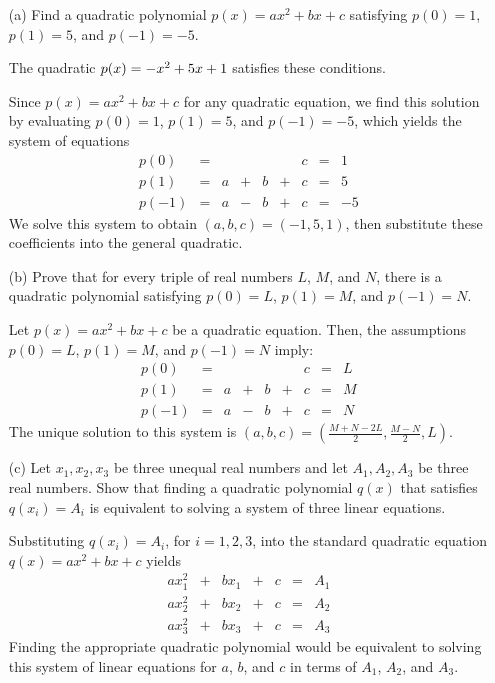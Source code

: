 \documentclass{ximera}
\begin{document}
\begin{exercise} \label{c2.1.11}
\begin{itemize}
\item[(a)] Find a quadratic polynomial $p(x) = ax^2 + bx + c$
  satisfying $p(0) = 1$, $p(1) = 5$, and $p(-1) = -5$.
  \begin{prompt}
    The quadratic $p(x) = {-x^2 + 5x + 1}$ satisfies these conditions.
  \end{prompt}
  \begin{hint}
    Since $p(x) = ax^2 + bx + c$ for any quadratic equation, we find
this solution by evaluating $p(0) = 1$, $p(1) = 5$, and $p(-1) = -5$,
which yields the system of equations
\[
\begin{array}{lrrrrrrrr}
p(0) & = & & & & & c & = & 1 \\
p(1) & = & a & + & b & + & c & = & 5 \\
p(-1) & = & a & - & b & + & c & = & -5\end{array}
\]
We solve this system to obtain $(a,b,c) = (-1,5,1)$, then substitute
these coefficients into the general quadratic.
  \end{hint}
\item[(b)] Prove that for every triple of real numbers $L$, $M$,
and $N$, there is a quadratic polynomial satisfying $p(0) = L$,
$p(1) = M$, and $p(-1) = N$.
\begin{hint}
   Let $p(x) = ax^2 + bx + c$ be a quadratic equation.  Then, the
assumptions $p(0) = L$, $p(1) = M$, and $p(-1) = N$ imply:
\[
\begin{array}{lrrrrrrrr}
p(0) & = & & & & & c & = & L \\
p(1) & = & a & + & b & + & c & = & M \\
p(-1) & = & a & - & b & + & c & = & N\end{array}
\]
The unique solution to this system is $(a,b,c) =
(\frac{M + N - 2L}{2},\frac{M - N}{2},L)$.
\end{hint}
\item[(c)] Let $x_1,x_2,x_3$ be three unequal real
numbers and let $A_1,A_2,A_3$ be three real numbers.  Show
that finding a quadratic polynomial $q(x)$ that satisfies
$q(x_i) = A_i$ is equivalent to solving a system of three
linear equations.
\begin{hint}
   Substituting $q(x_i) = A_i$, for $i = 1,2,3$, into the standard
quadratic equation $q(x) = ax^2 + bx + c$ yields
\[
\begin{array}{ccccccc}
ax_1^2 & + & bx_1 & + & c & = & A_1 \\
ax_2^2 & + & bx_2 & + & c & = & A_2 \\
ax_3^2 & + & bx_3 & + & c & = & A_3\end{array}
\]
Finding the appropriate quadratic polynomial would be equivalent to
solving this system of linear equations for $a$, $b$, and $c$ in
terms of $A_1$, $A_2$, and $A_3$.
\end{hint}
\end{itemize}


\end{exercise}
\end{document}
